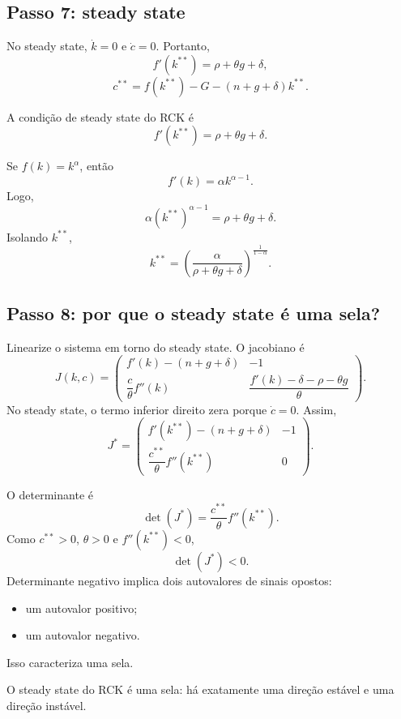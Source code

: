 \documentclass[11pt,a4paper]{article}
\begin{document}
\subsection{Passo 7: steady state}

No steady state, \(\dot k=0\) e \(\dot c=0\). Portanto,
\[
f'(k^{\ast\ast})=\rho+\theta g+\delta,
\]
\[
c^{\ast\ast}=f(k^{\ast\ast})-G-(n+g+\delta)k^{\ast\ast}.
\]

\begin{resultado}
A condi\c{c}\~ao de steady state do RCK \'e
\[
f'(k^{\ast\ast})=\rho+\theta g+\delta.
\]
\end{resultado}

Se \(f(k)=k^\alpha\), ent\~ao
\[
f'(k)=\alpha k^{\alpha-1}.
\]
Logo,
\[
\alpha(k^{\ast\ast})^{\alpha-1}=\rho+\theta g+\delta.
\]
Isolando \(k^{\ast\ast}\),
\[
k^{\ast\ast}
=
\left(\frac{\alpha}{\rho+\theta g+\delta}\right)^{\frac{1}{1-\alpha}}.
\]

\subsection{Passo 8: por que o steady state \'e uma sela?}

Linearize o sistema em torno do steady state. O jacobiano \'e
\[
J(k,c)=
\begin{pmatrix}
f'(k)-(n+g+\delta) & -1 \\
\dfrac{c}{\theta}f''(k) & \dfrac{f'(k)-\delta-\rho-\theta g}{\theta}
\end{pmatrix}.
\]
No steady state, o termo inferior direito zera porque \(\dot c=0\). Assim,
\[
J^\ast=
\begin{pmatrix}
f'(k^{\ast\ast})-(n+g+\delta) & -1 \\
\dfrac{c^{\ast\ast}}{\theta}f''(k^{\ast\ast}) & 0
\end{pmatrix}.
\]

O determinante \'e
\[
\det(J^\ast)
=
\frac{c^{\ast\ast}}{\theta}f''(k^{\ast\ast}).
\]
Como \(c^{\ast\ast}>0\), \(\theta>0\) e \(f''(k^{\ast\ast})<0\),
\[
\det(J^\ast)<0.
\]
Determinante negativo implica dois autovalores de sinais opostos:
\begin{itemize}
  \item um autovalor positivo;
  \item um autovalor negativo.
\end{itemize}
Isso caracteriza uma sela.

\begin{resultado}
O steady state do RCK \'e uma sela: h\'a exatamente uma dire\c{c}\~ao est\'avel e
uma dire\c{c}\~ao inst\'avel.
\end{resultado}
\end{document}
